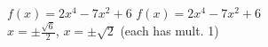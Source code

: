 {$f(x) = 2x^4-7x^2+6$}
{$f(x) = 2x^4-7x^2+6$ \\  $x = \pm \frac{\sqrt{6}}{2}$, $x = \pm \sqrt{2}$ (each has mult. 1)}